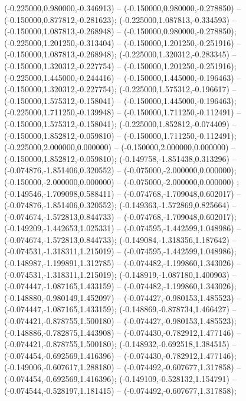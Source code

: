  (-0.225000,0.980000,-0.346913) -- (-0.150000,0.980000,-0.278850) -- (-0.150000,0.877812,-0.281623);
 (-0.225000,1.087813,-0.334593) -- (-0.150000,1.087813,-0.268948) -- (-0.150000,0.980000,-0.278850);
 (-0.225000,1.201250,-0.313404) -- (-0.150000,1.201250,-0.251916) -- (-0.150000,1.087813,-0.268948);
 (-0.225000,1.320312,-0.283345) -- (-0.150000,1.320312,-0.227754) -- (-0.150000,1.201250,-0.251916);
 (-0.225000,1.445000,-0.244416) -- (-0.150000,1.445000,-0.196463) -- (-0.150000,1.320312,-0.227754);
 (-0.225000,1.575312,-0.196617) -- (-0.150000,1.575312,-0.158041) -- (-0.150000,1.445000,-0.196463);
 (-0.225000,1.711250,-0.139948) -- (-0.150000,1.711250,-0.112491) -- (-0.150000,1.575312,-0.158041);
 (-0.225000,1.852812,-0.074409) -- (-0.150000,1.852812,-0.059810) -- (-0.150000,1.711250,-0.112491);
 (-0.225000,2.000000,0.000000) -- (-0.150000,2.000000,0.000000) -- (-0.150000,1.852812,-0.059810);
 (-0.149758,-1.851438,0.313296) -- (-0.074876,-1.851406,0.320552) -- (-0.075000,-2.000000,0.000000);
 (-0.150000,-2.000000,0.000000) -- (-0.075000,-2.000000,0.000000) ;
 (-0.149546,-1.709098,0.588411) -- (-0.074768,-1.709048,0.602017) -- (-0.074876,-1.851406,0.320552);
 (-0.149363,-1.572869,0.825664) -- (-0.074674,-1.572813,0.844733) -- (-0.074768,-1.709048,0.602017);
 (-0.149209,-1.442653,1.025331) -- (-0.074595,-1.442599,1.048986) -- (-0.074674,-1.572813,0.844733);
 (-0.149084,-1.318356,1.187642) -- (-0.074531,-1.318311,1.215019) -- (-0.074595,-1.442599,1.048986);
 (-0.148987,-1.199891,1.312785) -- (-0.074482,-1.199860,1.343026) -- (-0.074531,-1.318311,1.215019);
 (-0.148919,-1.087180,1.400903) -- (-0.074447,-1.087165,1.433159) -- (-0.074482,-1.199860,1.343026);
 (-0.148880,-0.980149,1.452097) -- (-0.074427,-0.980153,1.485523) -- (-0.074447,-1.087165,1.433159);
 (-0.148869,-0.878734,1.466427) -- (-0.074421,-0.878755,1.500180) -- (-0.074427,-0.980153,1.485523);
 (-0.148886,-0.782875,1.443908) -- (-0.074430,-0.782912,1.477146) -- (-0.074421,-0.878755,1.500180);
 (-0.148932,-0.692518,1.384515) -- (-0.074454,-0.692569,1.416396) -- (-0.074430,-0.782912,1.477146);
 (-0.149006,-0.607617,1.288180) -- (-0.074492,-0.607677,1.317858) -- (-0.074454,-0.692569,1.416396);
 (-0.149109,-0.528132,1.154791) -- (-0.074544,-0.528197,1.181415) -- (-0.074492,-0.607677,1.317858);
